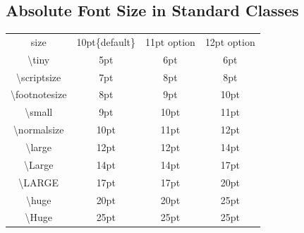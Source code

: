 \documentclass[11pt]{article}
\begin{document}
\subsection{Absolute Font Size in Standard Classes}
\begin{table}[!ht]
	\begin{center}
		\begin{tabular}{cccc}
			\hline
			size&10pt\{default\}&11pt option&12pt option\\
			\textbackslash tiny&5pt&6pt&6pt\\
			\textbackslash scriptsize&7pt&8pt&8pt\\
			\textbackslash footnotesize&8pt&9pt&10pt\\
			\textbackslash small&9pt&10pt&11pt\\
			\textbackslash normalsize&10pt&11pt&12pt\\
			\textbackslash large&12pt&12pt&14pt\\
			\textbackslash Large&14pt&14pt&17pt\\
			\textbackslash LARGE&17pt&17pt&20pt\\
			\textbackslash huge&20pt&20pt&25pt\\
			\textbackslash Huge&25pt&25pt&25pt\\
			\hline	
		\end{tabular}
		\label{Fonts and its Sizes}
	\end{center}
\end{table}
\end{document}
